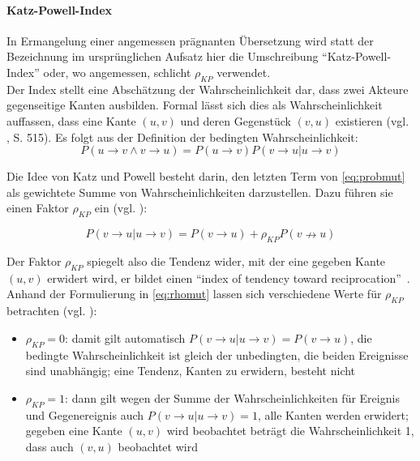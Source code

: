 \documentclass[11pt,a4paper,twoside]{article}
\providecommand{\tightlist}{%
  \setlength{\itemsep}{0pt}\setlength{\parskip}{0pt}}
\let\oldpar\paragraph
\renewcommand{\paragraph}{\oldpar*}
\begin{document}
\hypertarget{katz-powell-index}{%
\paragraph{Katz-Powell-Index}\label{katz-powell-index}}

In Ermangelung einer angemessen prägnanten Übersetzung wird statt der
Bezeichnung im ursprünglichen Aufsatz hier die Umschreibung
\enquote{Katz-Powell-Index} oder, wo angemessen, schlicht \(\rho_{KP}\)
verwendet.\\
Der Index stellt eine Abschätzung der Wahrscheinlichkeit dar, dass zwei
Akteure gegenseitige Kanten ausbilden. Formal lässt sich dies als
Wahrscheinlichkeit auffassen, dass eine Kante \((u,v)\) und deren
Gegenstück \((v,u)\) existieren (vgl. \autocite{Wasserman1994}, S. 515).
Es folgt aus der Definition der bedingten Wahrscheinlichkeit:
\begin{equation}
P(u \to v \wedge v \to u) = P(u \to v)P(v \to u|u\to v)
\label{eq:probmut}
\end{equation}

Die Idee von Katz und Powell besteht darin, den letzten Term von
\eqref{eq:probmut} als gewichtete Summe von Wahrscheinlichkeiten
darzustellen. Dazu führen sie einen Faktor \(\rho_{KP}\) ein (vgl.
\autocite{Wasserman1994}):

\begin{equation}
P(v \to u|u\to v) = P(v \to u) + \rho_{KP}P(v \nrightarrow u)
\label{eq:rhomut}
\end{equation}

Der Faktor \(\rho_{KP}\) spiegelt also die Tendenz wider, mit der eine
gegeben Kante \((u,v)\) erwidert wird, er bildet einen \enquote{index of
tendency toward reciprocation}~\autocite{Katz1955}. Anhand der
Formulierung in \eqref{eq:rhomut} lassen sich verschiedene Werte für
\(\rho_{KP}\) betrachten (vgl. \autocite{Wasserman1994}):

\begin{itemize}
\tightlist
\item
  \(\rho_{KP} = 0\): damit gilt automatisch
  \(P(v \to u|u\to v) = P(v \to u)\), die bedingte Wahrscheinlichkeit
  ist gleich der unbedingten, die beiden Ereignisse sind unabhängig;
  eine Tendenz, Kanten zu erwidern, besteht nicht
\item
  \(\rho_{KP} = 1\): dann gilt wegen der Summe der Wahrscheinlichkeiten
  für Ereignis und Gegenereignis auch \(P(v \to u|u\to v) = 1\), alle
  Kanten werden erwidert; gegeben eine Kante \((u,v)\) wird beobachtet
  beträgt die Wahrscheinlichkeit 1, dass auch \((v,u)\) beobachtet wird
\end{itemize}
\end{document}
